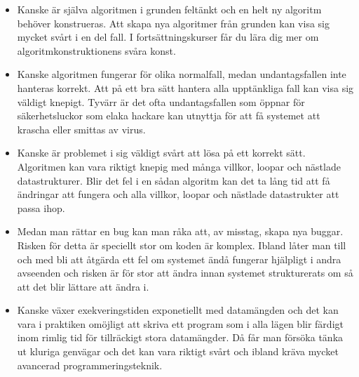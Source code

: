 \begin{itemize}
\item Kanske är själva algoritmen i grunden feltänkt och en helt ny algoritm behöver konstrueras. Att skapa nya algoritmer från grunden kan visa sig mycket svårt i en del fall. I fortsättningskurser får du lära dig mer om algoritmkonstruktionens svåra konst.

\item Kanske algoritmen fungerar för olika normalfall, medan undantagsfallen inte hanteras korrekt. Att på ett bra sätt hantera alla upptänkliga fall kan visa sig väldigt knepigt. Tyvärr är det ofta undantagsfallen som öppnar för säkerhetsluckor som elaka hackare kan utnyttja för att få systemet att krascha eller smittas av virus.

\item Kanske är problemet i sig väldigt svårt att lösa på ett korrekt sätt. Algoritmen kan vara riktigt knepig med många villkor, loopar och nästlade datastrukturer. Blir det fel i en sådan algoritm kan det ta lång tid att få ändringar att fungera och alla villkor, loopar och nästlade datastrukter att passa ihop. 

\item Medan man rättar en bug kan man råka att, av misstag, skapa nya buggar. Risken för detta är speciellt stor om koden är komplex. Ibland låter man till och med bli att åtgärda ett fel om systemet ändå fungerar hjälpligt i andra avseenden och risken är för stor att ändra innan systemet strukturerats om så att det blir lättare att ändra i.

\item Kanske växer exekveringstiden exponetiellt med datamängden och det kan vara i praktiken omöjligt att skriva ett program som i alla lägen blir färdigt inom rimlig tid för tillräckigt stora datamängder. Då får man försöka tänka ut kluriga genvägar och det kan vara riktigt svårt och ibland kräva mycket avancerad programmeringsteknik.
 
\end{itemize}